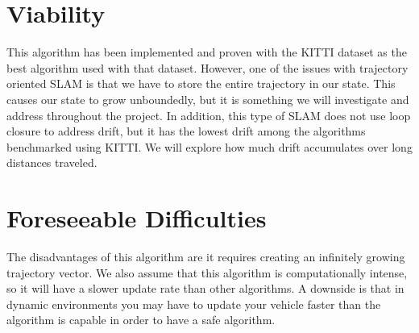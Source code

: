 \documentclass[a4paper,10pt]{article}
\begin{document}
\section{Viability}
This algorithm has been implemented and proven with the KITTI dataset as the best algorithm used with that dataset. However, one of the issues with trajectory oriented SLAM is that we have to store the entire trajectory in our state. This causes our state to grow unboundedly, but it is something we will investigate and address throughout the project. In addition, this type of SLAM does not use loop closure to address drift, but it has the lowest drift among the algorithms benchmarked using KITTI. We will explore how much drift accumulates over long distances traveled.

\section{Foreseeable Difficulties}
The disadvantages of this algorithm are it requires creating an infinitely growing trajectory vector. We also assume that this algorithm is computationally intense, so it will have a slower update rate than other algorithms. A downside is that in dynamic environments you may have to update your vehicle faster than the algorithm is capable in order to have a safe algorithm.

\medskip


\end{document}
